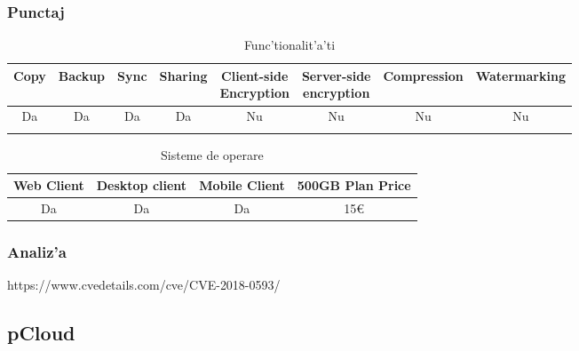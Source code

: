 \documentclass[12pt,a4paper,twoside]{report}
\newcommand{\greencheck}{\color{green}  \ding{51}}
\newcommand{\redxmark}{\color{red} \ding{55}}
\begin{document}
\subsubsection{Punctaj}
\begin{table}[H]
\centering
\caption{Func'tionalit'a'ti}
\begin{tabular}{|c|c|c|c|c|c|c|c|}          
\hline               
Copy & Backup & Sync & Sharing & \makecell{Client-side\\ Encryption} & \makecell{Server-side \\ encryption} & Compression & Watermarking \\ [0.5ex]   
\hline 
Da & Da & Da & Da & Nu & Nu & Nu & Nu    \\                      
\greencheck & \greencheck\greencheck & \greencheck & \greencheck & \redxmark\redxmark & \redxmark\redxmark &  \redxmark\redxmark &  \redxmark\redxmark  \\               
\hline                              
\end{tabular}
\label{table:onedrivefeaturetable}             
\end{table}
\begin{table}[H]
\centering
\caption{Sisteme de operare}
\begin{tabular}{|c|c|c|c|}          
\hline                      
 Web Client & Desktop client & Mobile Client & 500GB Plan Price\\ [0.5ex]   
\hline                            
Da & Da & Da & 15\euro \\               
\hline                              
\end{tabular}
\label{table:onedrivesystemtable}             
\end{table}
\subsubsection{Analiz'a}
https://www.cvedetails.com/cve/CVE-2018-0593/

\subsection{pCloud}
\end{document}
